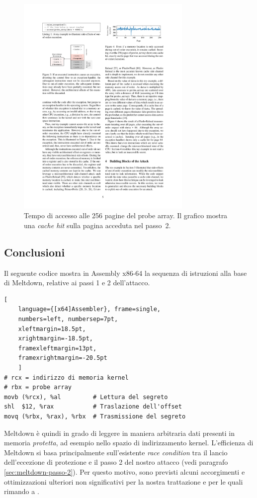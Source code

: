 \begin{figure}
	\centering
	\includegraphics[width=0.75\textwidth]{"img/probe-array.pdf"}
	\caption{Tempo di accesso alle 256 pagine del probe array. Il grafico mostra una \emph{cache hit} sulla pagina acceduta nel passo~2.~\cite{lipp:meltdown}}
	\label{fig:probe-array}
\end{figure}


\subsection{Conclusioni}
\label{sec:meltdown-conclusioni}
Il seguente codice mostra in Assembly x86-64 la sequenza di istruzioni alla base di Meltdown, relative ai passi 1 e 2 dell'attacco.

\begin{lstlisting}[
	language={[x64]Assembler}, frame=single,
	numbers=left, numbersep=7pt,
	xleftmargin=18.5pt,
	xrightmargin=-18.5pt,
	framexleftmargin=13pt,
	framexrightmargin=-20.5pt
	]
# rcx = indirizzo di memoria kernel
# rbx = probe array
movb (%rcx), %al         # Lettura del segreto
shl  $12, %rax           # Traslazione dell'offset
movq (%rbx, %rax), %rbx  # Trasmissione del segreto
\end{lstlisting} 

Meltdown è quindi in grado di leggere in maniera arbitraria dati presenti in memoria \emph{protetta}, ad esempio nello spazio di indirizzamento kernel. 
L'efficienza di Meltdown si basa principalmente sull'esistente \emph{race condition} tra il lancio dell'eccezione di protezione e il passo 2 del nostro attacco (vedi paragrafo \vref{sec:meltdown-passo-2}). Per questo motivo, sono previsti alcuni accorgimenti e ottimizzazioni ulteriori non significativi per la nostra trattazione e per le quali rimando a \textcite{lipp:meltdown}.

